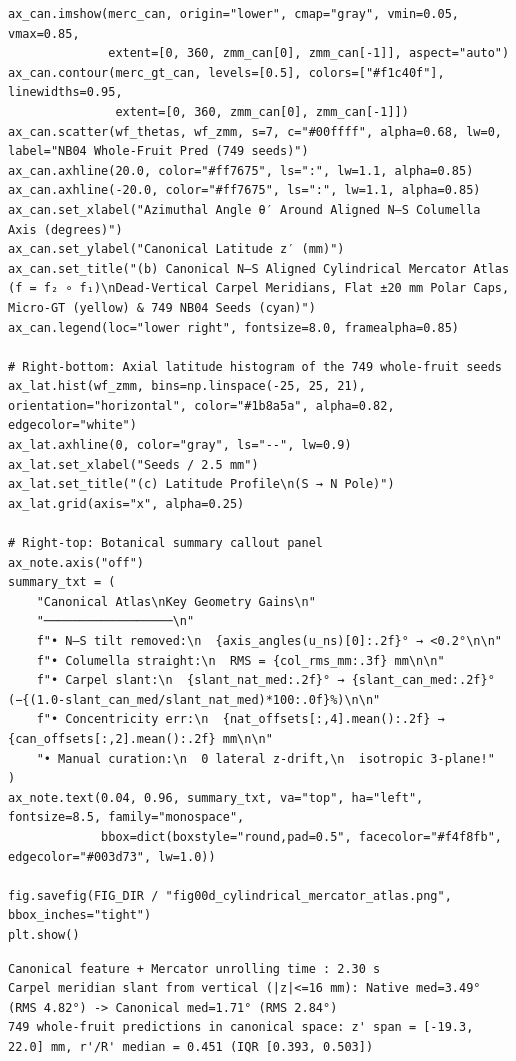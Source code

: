 \documentclass[10pt,a4paper]{article}
\renewcommand{\_}{\origunderscore\allowbreak}
\begin{document}
\begin{codebox}
\begin{lstlisting}[style=pybmed]
ax_can.imshow(merc_can, origin="lower", cmap="gray", vmin=0.05, vmax=0.85,
              extent=[0, 360, zmm_can[0], zmm_can[-1]], aspect="auto")
ax_can.contour(merc_gt_can, levels=[0.5], colors=["#f1c40f"], linewidths=0.95,
               extent=[0, 360, zmm_can[0], zmm_can[-1]])
ax_can.scatter(wf_thetas, wf_zmm, s=7, c="#00ffff", alpha=0.68, lw=0, label="NB04 Whole-Fruit Pred (749 seeds)")
ax_can.axhline(20.0, color="#ff7675", ls=":", lw=1.1, alpha=0.85)
ax_can.axhline(-20.0, color="#ff7675", ls=":", lw=1.1, alpha=0.85)
ax_can.set_xlabel("Azimuthal Angle θ′ Around Aligned N–S Columella Axis (degrees)")
ax_can.set_ylabel("Canonical Latitude z′ (mm)")
ax_can.set_title("(b) Canonical N–S Aligned Cylindrical Mercator Atlas (f = f₂ ∘ f₁)\nDead-Vertical Carpel Meridians, Flat ±20 mm Polar Caps, Micro-GT (yellow) & 749 NB04 Seeds (cyan)")
ax_can.legend(loc="lower right", fontsize=8.0, framealpha=0.85)

# Right-bottom: Axial latitude histogram of the 749 whole-fruit seeds
ax_lat.hist(wf_zmm, bins=np.linspace(-25, 25, 21), orientation="horizontal", color="#1b8a5a", alpha=0.82, edgecolor="white")
ax_lat.axhline(0, color="gray", ls="--", lw=0.9)
ax_lat.set_xlabel("Seeds / 2.5 mm")
ax_lat.set_title("(c) Latitude Profile\n(S → N Pole)")
ax_lat.grid(axis="x", alpha=0.25)

# Right-top: Botanical summary callout panel
ax_note.axis("off")
summary_txt = (
    "Canonical Atlas\nKey Geometry Gains\n"
    "──────────────────\n"
    f"• N–S tilt removed:\n  {axis_angles(u_ns)[0]:.2f}° → <0.2°\n\n"
    f"• Columella straight:\n  RMS = {col_rms_mm:.3f} mm\n\n"
    f"• Carpel slant:\n  {slant_nat_med:.2f}° → {slant_can_med:.2f}° (−{(1.0-slant_can_med/slant_nat_med)*100:.0f}%)\n\n"
    f"• Concentricity err:\n  {nat_offsets[:,4].mean():.2f} → {can_offsets[:,2].mean():.2f} mm\n\n"
    "• Manual curation:\n  0 lateral z-drift,\n  isotropic 3-plane!"
)
ax_note.text(0.04, 0.96, summary_txt, va="top", ha="left", fontsize=8.5, family="monospace",
             bbox=dict(boxstyle="round,pad=0.5", facecolor="#f4f8fb", edgecolor="#003d73", lw=1.0))

fig.savefig(FIG_DIR / "fig00d_cylindrical_mercator_atlas.png", bbox_inches="tight")
plt.show()
\end{lstlisting}
\end{codebox}
\begin{outbox}
\begin{lstlisting}[style=outbmed]
Canonical feature + Mercator unrolling time : 2.30 s
Carpel meridian slant from vertical (|z|<=16 mm): Native med=3.49° (RMS 4.82°) -> Canonical med=1.71° (RMS 2.84°)
749 whole-fruit predictions in canonical space: z' span = [-19.3, 22.0] mm, r'/R' median = 0.451 (IQR [0.393, 0.503])
\end{lstlisting}
\end{outbox}
\end{document}
